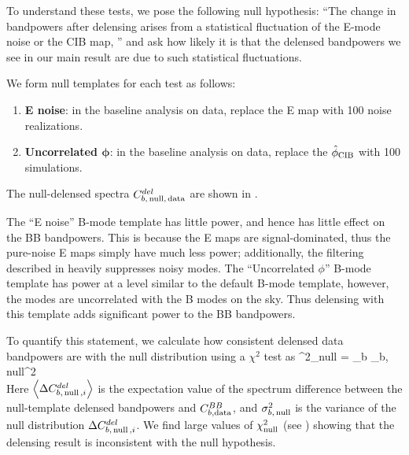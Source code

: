 To understand these tests, we pose the following null hypothesis:
``The change in bandpowers after delensing arises from a statistical fluctuation of the E-mode noise or the CIB map, ''
and ask how likely it is that the delensed bandpowers we see in our main result are due to such statistical fluctuations.

We form null templates for each test as follows:
\begin{enumerate}[leftmargin=0.5cm]
  \item{\textbf{E noise}: in the baseline analysis on data, replace the E map with 100 noise realizations.
     }
  \item{\textbf{Uncorrelated $\mathbf{\phi}$}: in the baseline analysis on data, replace the $\hat{\phi}_{\rm CIB}$ with 100 simulations.
     }
\end{enumerate}
The null-delensed spectra $C^{del}_{b,\,{\rm null},\,{\rm data}}$ are shown in .

The ``E noise'' B-mode template has little power, and hence has little effect on the BB bandpowers.
This is because the \sptpol E maps are signal-dominated, thus the pure-noise E maps simply have much less power;
additionally, the filtering described in  heavily suppresses noisy modes.
The ``Uncorrelated $\phi$'' B-mode template has power at a level similar to the default B-mode template, however, the modes are uncorrelated with the B modes on the sky.
Thus delensing with this template adds significant power to the BB bandpowers.

To quantify this statement, we calculate how consistent delensed data bandpowers are with the null distribution using a $\chi^2$ test as
\beq
\label{eqn:chisq_null2}
  \chi^2_{\rm null} = \sum_b{  { \sigma_{b,\,{\rm null}}^2} } \\
\eeq
Here $\left<\Delta C^{del}_{b,\,{\rm null}\,,i}\right>$ is the expectation value of the spectrum difference between the null-template delensed bandpowers and $C^{BB}_{b,{\rm data}}$,
and $\sigma_{b,\,{\rm null}}^2$ is the variance of the null distribution $\Delta C^{del}_{b,\,{\rm null}\,,i}$.
We find large values of $\chi^2_{\rm null}$ (see ) showing that the delensing result is inconsistent with the null hypothesis.


